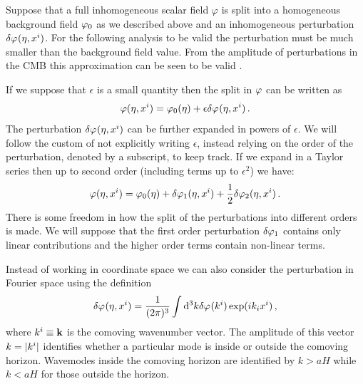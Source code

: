 Suppose that a full inhomogeneous scalar field
$\varphi$ is split into a homogeneous background field $\varphi_0$ as we described
above and an inhomogeneous perturbation $\delta\varphi_{}(\eta,x^i)$. For the following
analysis to be valid the perturbation must be much smaller than the background
field value. From the amplitude of perturbations in the CMB this approximation
can be seen to be valid \cite{Komatsu:2008hk}. 

If we suppose that $\epsilon$ is a small quantity then the split in $\varphi$
can be written as \cite{Malik:2008im}
% 
\begin{equation}
\label{eq:pertsplit-intro}
\varphi(\eta, x^i) = \varphi_0(\eta) + \epsilon\delta\varphi_{}(\eta, x^i) \,.
\end{equation}
% 
 The perturbation $\delta\varphi_{}(\eta, x^i)$ can be further expanded in
powers of $\epsilon$.  We will follow the
custom of not explicitly writing $\epsilon$, instead relying on the order of
the perturbation, denoted by a subscript, to keep track.
If we expand in a Taylor series then up to second order (\ie including terms
up to $\epsilon^2$) we have:
% 
\begin{equation}
 \varphi(\eta, x^i) = \varphi_0(\eta) + \delta\varphi_{1}(\eta, x^i) + \frac{1}{2}\delta\varphi_{2}(\eta, x^i)
\,.
\end{equation}
% 
There is some freedom in how the split of the perturbations into different
orders is made. We will suppose that the first order perturbation $\delta\varphi_{1}$
contains only linear contributions and the higher order terms contain non-linear
terms. 


Instead of working in coordinate space we can also consider
the perturbation in Fourier space using the definition
% 
\begin{equation}
\label{eq:fourierdefn-intro}
 \delta\varphi_{}(\eta, x^i) = \frac{1}{(2 \pi)^3} \int \mathrm{d}^3k \delta\varphi_{}(k^i) \exp (i k_i
x^i)
\,,
\end{equation}
where $k^i\equiv \textbf{k}$ is the comoving wavenumber vector. The amplitude of this
vector $k=|k^i|$ identifies whether a particular mode is inside or outside
the comoving horizon. Wavemodes inside the comoving horizon are identified by
$k>aH$ while $k<aH$ for those outside the horizon. 


